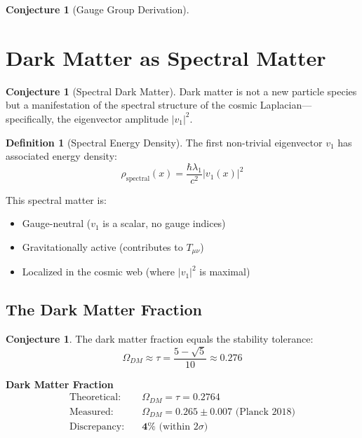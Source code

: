 \documentclass[11pt,a4paper]{article}
\theoremstyle{plain}
\theoremstyle{definition}
\newtheorem{definition}[theorem]{Definition}
\newtheorem{conjecture}[theorem]{Conjecture}
\theoremstyle{remark}
\begin{document}
\begin{conjecture}[Gauge Group Derivation]
\section{Dark Matter as Spectral Matter}

\begin{conjecture}[Spectral Dark Matter]
Dark matter is not a new particle species but a manifestation of the spectral structure of the cosmic Laplacian---specifically, the eigenvector amplitude $|v_1|^2$.
\end{conjecture}

\begin{definition}[Spectral Energy Density]
The first non-trivial eigenvector $v_1$ has associated energy density:
\begin{equation}
\rho_{\text{spectral}}(x) = \frac{\hbar\lambda_1}{c^2}|v_1(x)|^2
\end{equation}
\end{definition}

This spectral matter is:
\begin{itemize}[noitemsep]
    \item Gauge-neutral ($v_1$ is a scalar, no gauge indices)
    \item Gravitationally active (contributes to $T_{\mu\nu}$)
    \item Localized in the cosmic web (where $|v_1|^2$ is maximal)
\end{itemize}

\subsection{The Dark Matter Fraction}

\begin{conjecture}
The dark matter fraction equals the stability tolerance:
\begin{equation}
\Omega_{DM} \approx \tau = \frac{5-\sqrt{5}}{10} \approx 0.276
\end{equation}
\end{conjecture}

\begin{derivedconstant}
\textbf{Dark Matter Fraction}
\begin{align*}
\text{Theoretical:} \quad & \Omega_{DM} = \tau = 0.2764 \\
\text{Measured:} \quad & \Omega_{DM} = 0.265 \pm 0.007 \text{ (Planck 2018)} \\
\text{Discrepancy:} \quad & \mathbf{4\%} \text{ (within } 2\sigma\text{)}
\end{align*}
\end{derivedconstant}


\end{conjecture}
\end{document}
